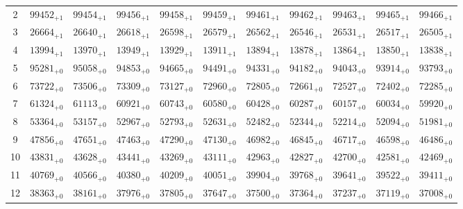 \documentclass[10pt, a4paper]{article}
\begin{document}
\begin{center}
\begin{tabular}{c || c c c c c | c c c c c}
        2 & \({99452}_{+1}\) & \({99454}_{+1}\) & \({99456}_{+1}\) & \({99458}_{+1}\) & \({99459}_{+1}\) & \({99461}_{+1}\) & \({99462}_{+1}\) & \({99463}_{+1}\) & \({99465}_{+1}\) & \({99466}_{+1}\)\\
        3 & \({26664}_{+1}\) & \({26640}_{+1}\) & \({26618}_{+1}\) & \({26598}_{+1}\) & \({26579}_{+1}\) & \({26562}_{+1}\) & \({26546}_{+1}\) & \({26531}_{+1}\) & \({26517}_{+1}\) & \({26505}_{+1}\)\\
        4 & \({13994}_{+1}\) & \({13970}_{+1}\) & \({13949}_{+1}\) & \({13929}_{+1}\) & \({13911}_{+1}\) & \({13894}_{+1}\) & \({13878}_{+1}\) & \({13864}_{+1}\) & \({13850}_{+1}\) & \({13838}_{+1}\)\\
        5 & \({95281}_{+0}\) & \({95058}_{+0}\) & \({94853}_{+0}\) & \({94665}_{+0}\) & \({94491}_{+0}\) & \({94331}_{+0}\) & \({94182}_{+0}\) & \({94043}_{+0}\) & \({93914}_{+0}\) & \({93793}_{+0}\)\\
        \hline
        6 & \({73722}_{+0}\) & \({73506}_{+0}\) & \({73309}_{+0}\) & \({73127}_{+0}\) & \({72960}_{+0}\) & \({72805}_{+0}\) & \({72661}_{+0}\) & \({72527}_{+0}\) & \({72402}_{+0}\) & \({72285}_{+0}\)\\
        7 & \({61324}_{+0}\) & \({61113}_{+0}\) & \({60921}_{+0}\) & \({60743}_{+0}\) & \({60580}_{+0}\) & \({60428}_{+0}\) & \({60287}_{+0}\) & \({60157}_{+0}\) & \({60034}_{+0}\) & \({59920}_{+0}\)\\
        8 & \({53364}_{+0}\) & \({53157}_{+0}\) & \({52967}_{+0}\) & \({52793}_{+0}\) & \({52631}_{+0}\) & \({52482}_{+0}\) & \({52344}_{+0}\) & \({52214}_{+0}\) & \({52094}_{+0}\) & \({51981}_{+0}\)\\
        9 & \({47856}_{+0}\) & \({47651}_{+0}\) & \({47463}_{+0}\) & \({47290}_{+0}\) & \({47130}_{+0}\) & \({46982}_{+0}\) & \({46845}_{+0}\) & \({46717}_{+0}\) & \({46598}_{+0}\) & \({46486}_{+0}\)\\
        10 & \({43831}_{+0}\) & \({43628}_{+0}\) & \({43441}_{+0}\) & \({43269}_{+0}\) & \({43111}_{+0}\) & \({42963}_{+0}\) & \({42827}_{+0}\) & \({42700}_{+0}\) & \({42581}_{+0}\) & \({42469}_{+0}\)\\
        \hline
        11 & \({40769}_{+0}\) & \({40566}_{+0}\) & \({40380}_{+0}\) & \({40209}_{+0}\) & \({40051}_{+0}\) & \({39904}_{+0}\) & \({39768}_{+0}\) & \({39641}_{+0}\) & \({39522}_{+0}\) & \({39411}_{+0}\)\\
        12 & \({38363}_{+0}\) & \({38161}_{+0}\) & \({37976}_{+0}\) & \({37805}_{+0}\) & \({37647}_{+0}\) & \({37500}_{+0}\) & \({37364}_{+0}\) & \({37237}_{+0}\) & \({37119}_{+0}\) & \({37008}_{+0}\)\\

\end{tabular}
\end{center}
\end{document}
